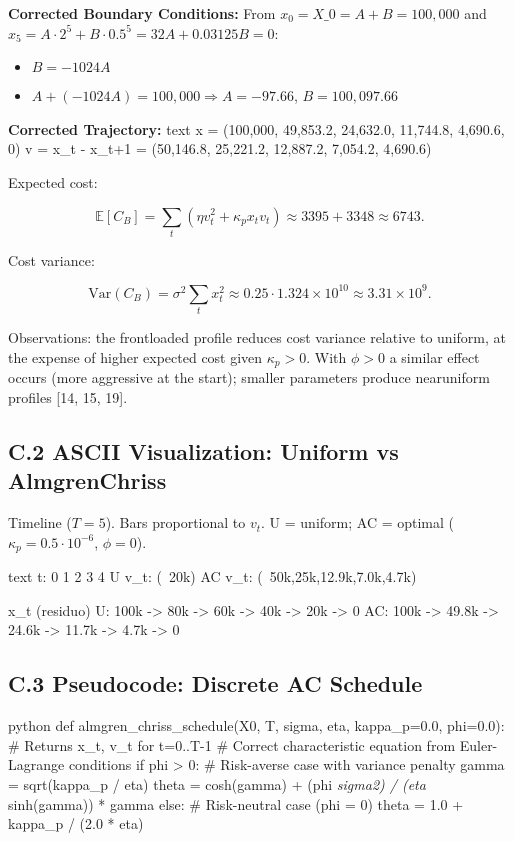\documentclass[11pt]{article}
\begin{document}
\textbf{Corrected Boundary Conditions:}
From $x_0 = X\_0 = A + B = 100,000$ and $x_5 = A \cdot 2^5 + B \cdot 0.5^5 = 32A + 0.03125B = 0$:
\begin{itemize}
\item $B = -1024A$ 
\item $A + (-1024A) = 100,000 \Rightarrow A = -97.66$, $B = 100,097.66$

\end{itemize}
\textbf{Corrected Trajectory:}
text
x = (100,000, 49,853.2, 24,632.0, 11,744.8, 4,690.6, 0)
v = x_t - x_{t+1} = (50,146.8, 25,221.2, 12,887.2, 7,054.2, 4,690.6)

Expected cost:

\begin{equation}
\mathbb{E}[C_B] = \sum_t (\eta v_t^2 + \kappa_p x_t v_t) \approx 3395 + 3348 \approx 6743.
\end{equation}

Cost variance:

\begin{equation}
\mathrm{Var}(C_B) = \sigma^2\sum_t x_t^2 \approx 0.25\cdot 1.324\times 10^{10} \approx 3.31\times 10^9.
\end{equation}

Observations: the frontloaded profile reduces cost variance relative to uniform, at the expense of higher expected cost given $\kappa_p>0$. With $\phi>0$ a similar effect occurs (more aggressive at the start); smaller parameters produce nearuniform profiles [14, 15, 19].

\subsection{C.2 ASCII Visualization: Uniform vs AlmgrenChriss}

Timeline ($T=5$). Bars proportional to $v_t$. U = uniform; AC = optimal ($\kappa_p=0.5\cdot 10^{-6}$, $\phi=0$).

text
t:      0        1        2        3        4
U v_t:        (~20k)
AC v\_t:               (~50k,25k,12.9k,7.0k,4.7k)

x\_t (residuo)
U:      100k -> 80k -> 60k -> 40k -> 20k -> 0
AC:     100k -> 49.8k -> 24.6k -> 11.7k -> 4.7k -> 0

\subsection{C.3 Pseudocode: Discrete AC Schedule}

python
def almgren\_chriss\_schedule(X0, T, sigma, eta, kappa\_p=0.0, phi=0.0):
    \# Returns x\_t, v\_t for t=0..T-1
    \# Correct characteristic equation from Euler-Lagrange conditions
    if phi > 0:
        \# Risk-averse case with variance penalty
        gamma = sqrt(kappa\_p / eta)  
        theta = cosh(gamma) + (phi \textit{ sigma}\textit{2) / (eta } sinh(gamma)) * gamma
    else:
        \# Risk-neutral case (phi = 0)
        theta = 1.0 + kappa\_p / (2.0 * eta)
    
\end{document}
